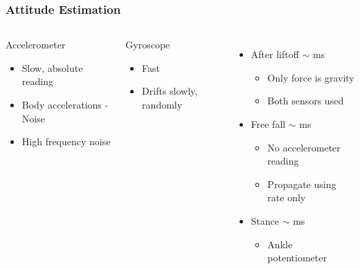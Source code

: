 \begin{frame}
\frametitle{Attitude Estimation}

\begin{columns}


\begin{block}{Accelerometer}
\begin{itemize}
\item
Slow, absolute reading
\item
\alert{Body accelerations} - Noise
\item
High frequency noise
\end{itemize}
\end{block}

\begin{block}{Gyroscope}
\begin{itemize}
\item
Fast
\item
Drifts slowly, randomly
\end{itemize}
\end{block}

\begin{itemize}
    \item
    After liftoff $\sim$ {  ms}\\[0.1in]
    \begin{itemize}
        \item
        Only force is gravity\\[0.1in]
        \item
        Both sensors used\\[0.2in]
    \end{itemize}

    \item
    Free fall $\sim$ { ms}\\[0.1in]
    \begin{itemize}
        \item
        No accelerometer reading\\[0.1in]
        \item
        Propagate using rate only\\[0.2in]
    \end{itemize}

    \item
    Stance $\sim$ { ms}\\[0.1in]
    \begin{itemize}
        \item
        \alert{Ankle potentiometer}
    \end{itemize}

\end{itemize}
\end{columns}
\end{frame}


